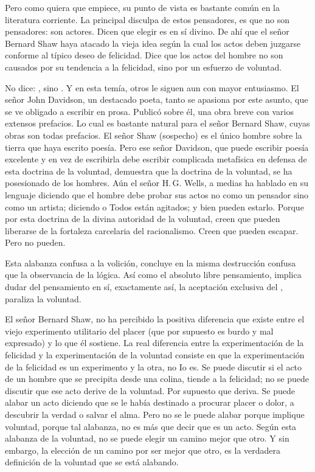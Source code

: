 Pero como quiera que empiece, su punto de vista es bastante común en la literatura corriente. La principal
disculpa de estos pensadores, es que no son pensadores: son actores. Dicen que elegir es en sí divino. De
ahí que el señor Bernard Shaw haya atacado la vieja idea según la cual los actos deben juzgarse conforme
al típico deseo de felicidad. Dice que los actos del hombre no son causados por su tendencia a la felicidad,
sino por un esfuerzo de voluntad.

No dice: , sino . Y en esta temía, otros le siguen aun con
mayor entusiasmo. El señor John Davidson, un destacado poeta, tanto se apasiona por este asunto, que se
ve obligado a escribir en prosa. Publicó sobre él, una obra breve con varios extensos prefacios. Lo cual es
bastante natural para el señor Bernard Shaw, cuyas obras son todas prefacios. El señor Shaw (sospecho)
es el único hombre sobre la tierra que haya escrito poesía. Pero ese señor Davidson, que puede escribir
poesía excelente y en vez de escribirla debe escribir complicada metafísica en defensa de esta doctrina de
la voluntad, demuestra que la doctrina de la voluntad, se ha posesionado de los hombres. Aún el señor H.\,G. Wells,
a medias ha hablado en su lenguaje diciendo que el hombre debe probar sus actos no como un
pensador sino como un artista; diciendo  o  Todos están agitados; y bien pueden estarlo. Porque por esta doctrina de la divina autoridad de la
voluntad, creen que pueden liberarse de la fortaleza carcelaria del racionalismo. Creen que pueden
escapar. Pero no pueden.

Esta alabanza confusa a la volición, concluye en la misma destrucción confusa que la observancia
de la lógica. Así como el absoluto libre pensamiento, implica dudar del pensamiento en sí, exactamente
así, la aceptación exclusiva del , paraliza la voluntad.

El señor Bernard Shaw, no ha percibido la positiva diferencia que existe entre el viejo experimento
utilitario del placer (que por supuesto es burdo y mal expresado) y lo que él sostiene. La real diferencia
entre la experimentación de la felicidad y la experimentación de la voluntad consiste en que la
experimentación de la felicidad es un experimento y la otra, no Io es. Se puede discutir si el acto de un
hombre que se precipita desde una colina, tiende a la felicidad; no se puede discutir que ese acto derive de
la voluntad. Por supuesto que deriva. Se puede alabar un acto diciendo que se le había destinado a
procurar placer o dolor, a descubrir la verdad o salvar el alma. Pero no se le puede alabar porque implique
voluntad, porque tal alabanza, no es más que decir que es un acto. Según esta alabanza de la voluntad, no
se puede elegir un camino mejor que otro. Y sin embargo, la elección de un camino por ser mejor que
otro, es la verdadera definición de la voluntad que se está alabando.

